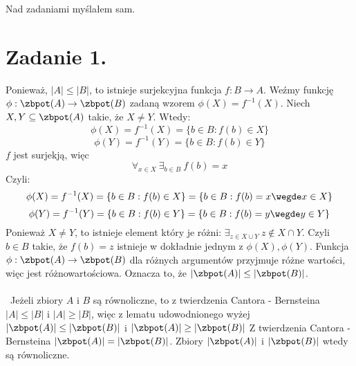 \documentclass{article}
\begin{document}
 
 
 
 
 
 
 
 
 
 
 
\maketitle
Nad zadaniami myślałem sam. 
\section*{Zadanie 1.}
Ponieważ, $|A|\leq|B|$, to istnieje surjekcyjna funkcja $f: B \rightarrow A$. Weźmy funkcję $\phi: \zbpot(A) \rightarrow \zbpot(B)$ zadaną wzorem $\phi (X) = f^{-1} (X)$. Niech $X,Y \subseteq \zbpot(A) $ takie, że $X\neq Y$. Wtedy:
\[ \phi (X) = f^{-1}(X) = \{b\in B: f(b)\in X \}\]
\[ \phi (Y) = f^{-1}(Y) = \{b\in B: f(b)\in Y \}\]
$f$ jest surjekją, więc \[\forall_{x \in X} \ \exists_{b\in B} \ f(b) = x\]
Czyli:
\[ \phi (X) = f^{-1}(X) = \{b\in B: f(b)\in X \} = \{b\in B: f(b)=x \wegde x\in X\}\]
\[ \phi (Y) = f^{-1}(Y) = \{b\in B: f(b)\in Y \} = \{b\in B: f(b)=y \wegde y\in Y\}\]
Ponieważ $X \neq Y$, to istnieje element który je różni: $\exists_{z\in X \cup Y} \ z \notin X \cap Y$. Czyli $b \in B$ takie, że $f(b) = z$ istnieje w dokładnie jednym z $ \phi(X), \phi(Y)$. Funkcja $\phi : \zbpot(A) \rightarrow \zbpot(B)$ dla różnych argumentów przyjmuje różne wartości, więc jest różnowartościowa. Oznacza to, że $|\zbpot(A)|\leq|\zbpot(B)|$.
\\\
\\\
Jeżeli zbiory $A$ i $B$ są równoliczne, to z twierdzenia Cantora - Bernsteina $|A|\leq|B|$ i $|A|\geq|B|$, więc z lematu udowodnionego wyżej $|\zbpot(A)|\leq|\zbpot(B)|$ i $|\zbpot(A)|\geq|\zbpot(B)|$
Z twierdzenia Cantora - Bernsteina $|\zbpot(A)| = |\zbpot(B)|$. Zbiory $|\zbpot(A)|$ i $|\zbpot(B)|$ wtedy są równoliczne.
\end{document}
